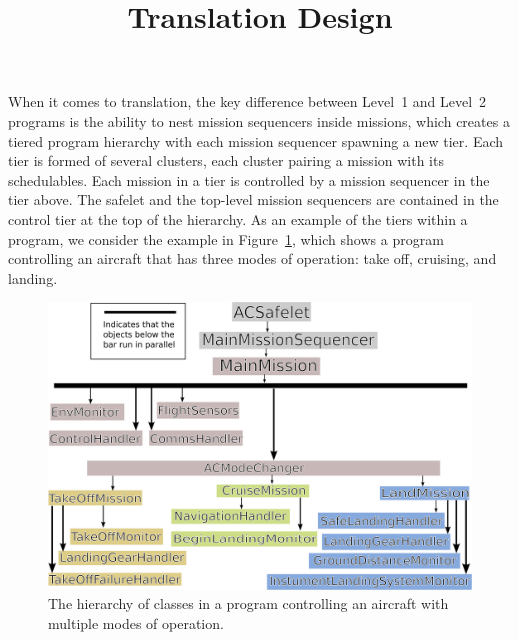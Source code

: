 \documentclass[10pt,a4paper]{article}
\begin{document}
\title{Translation Design}
\date{}
\maketitle


When it comes to translation, the key difference between Level~1 and Level~2 programs is the ability to nest mission sequencers inside missions, which creates a tiered program hierarchy with each mission sequencer spawning a new tier. Each tier is formed of several clusters, each cluster pairing a mission with its schedulables. Each mission in a tier is controlled by a mission sequencer in the tier above. The safelet and the top-level mission sequencers are contained in the control tier at the top of the hierarchy. As an example of the tiers within a program, we consider the example in Figure~\ref{fig:AircraftDiagram}, which shows a program controlling an aircraft that has three modes of operation: take off, cruising, and landing.

\begin{figure}[!h]
\begin{center}
\includegraphics[scale=0.7]{AircraftStructure.png}
\caption{The hierarchy of classes in a program controlling an aircraft with multiple modes of operation. \label{fig:AircraftDiagram}}
\end{center}
\end{figure}
\end{document}
